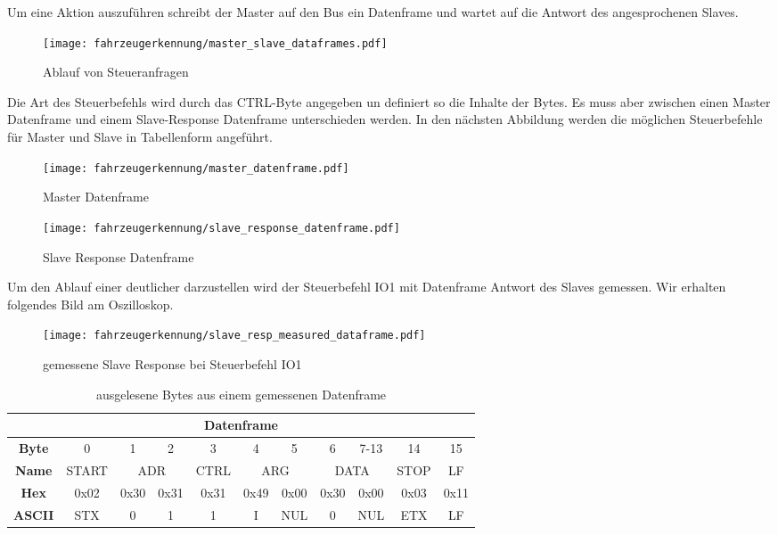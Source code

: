 Um eine Aktion auszuführen schreibt der Master auf den Bus ein Datenframe und wartet auf die Antwort des angesprochenen Slaves. 

\begin{figure}[H]
    \centering
    \texttt{[image: fahrzeugerkennung/master\_slave\_dataframes.pdf]}
    \caption{Ablauf von Steueranfragen}
\end{figure}

Die Art des Steuerbefehls wird durch das CTRL-Byte angegeben un definiert so die Inhalte der Bytes. Es muss aber zwischen einen Master Datenframe und einem Slave-Response Datenframe unterschieden werden. 
In den nächsten Abbildung werden die möglichen Steuerbefehle für Master und Slave in Tabellenform angeführt.

\begin{sidewaysfigure} \label{fig:master_frame}
    \centering
    \texttt{[image: fahrzeugerkennung/master\_datenframe.pdf]}
    
    \caption{Master Datenframe}
\end{sidewaysfigure}

\begin{sidewaysfigure}
    \centering
    \texttt{[image: fahrzeugerkennung/slave\_response\_datenframe.pdf]}
    \caption{Slave Response Datenframe}
\end{sidewaysfigure}
\pagebreak
Um den Ablauf einer deutlicher darzustellen wird der Steuerbefehl IO1 mit Datenframe Antwort des Slaves gemessen. 
Wir erhalten folgendes Bild am Oszilloskop.

\begin{figure}[H]
    \centering
    \texttt{[image: fahrzeugerkennung/slave\_resp\_measured\_dataframe.pdf]}
    \caption{gemessene Slave Response bei Steuerbefehl IO1}
\end{figure}

\begin{table}[h]
    \centering
    \begin{tabular}{|c|c|c|c|c|c|c|c|c|l|l|l|l|l|l|c|c|}
        \hline
        \multicolumn{17}{|c|}{\textbf{Datenframe}}                                                                                           \\ \hline
        \textbf{Byte}  & 0     & 1           & 2          & 3    & 4           & 5          & 6    & \multicolumn{7}{c|}{7-13} & 14   & 15   \\ \hline
        \textbf{Name}  & START & \multicolumn{2}{c|}{ADR} & CTRL & \multicolumn{2}{c|}{ARG} & \multicolumn{8}{c|}{DATA}        & STOP & LF   \\ \hline
        \textbf{Hex}   & 0x02  & 0x30        & 0x31       & 0x31 & 0x49        & 0x00       & 0x30 & \multicolumn{7}{c|}{0x00} & 0x03 & 0x11 \\ \hline
        \textbf{ASCII} & STX   & 0           & 1          & 1    & I           & NUL        & 0    & \multicolumn{7}{c|}{NUL}  & ETX  & LF   \\ \hline
    \end{tabular}
    \caption{ausgelesene Bytes aus einem gemessenen Datenframe}
\end{table}

